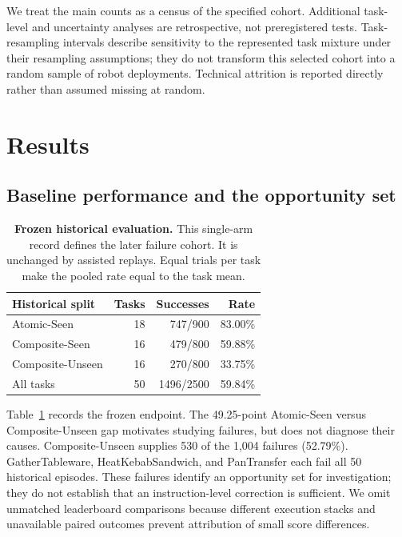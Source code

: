 \documentclass[10pt,twocolumn,letterpaper]{article}
\begin{document}
We treat the main counts as a census of the specified cohort. Additional task-level and uncertainty analyses are retrospective, not preregistered tests. Task-resampling intervals describe sensitivity to the represented task mixture under their resampling assumptions; they do not transform this selected cohort into a random sample of robot deployments. Technical attrition is reported directly rather than assumed missing at random.

\section{Results}
\label{sec:results}
\subsection{Baseline performance and the opportunity set}
\begin{table}[t]
\centering\small
\begin{tabular}{@{}lrrr@{}}
\toprule
Historical split & Tasks & Successes & Rate\\
\midrule
Atomic-Seen &18&747/900&83.00\%\\
Composite-Seen &16&479/800&59.88\%\\
Composite-Unseen &16&270/800&33.75\%\\
\midrule
All tasks &50&1496/2500&59.84\%\\
\bottomrule
\end{tabular}
\caption{\textbf{Frozen historical evaluation.} This single-arm record defines the later failure cohort. It is unchanged by assisted replays. Equal trials per task make the pooled rate equal to the task mean.}
\label{tab:baseline}
\end{table}
Table~\ref{tab:baseline} records the frozen endpoint. The 49.25-point Atomic-Seen versus Composite-Unseen gap motivates studying failures, but does not diagnose their causes. Composite-Unseen supplies 530 of the 1,004 failures (52.79\%). GatherTableware, HeatKebabSandwich, and PanTransfer each fail all 50 historical episodes. These failures identify an opportunity set for investigation; they do not establish that an instruction-level correction is sufficient. We omit unmatched leaderboard comparisons because different execution stacks and unavailable paired outcomes prevent attribution of small score differences.
\end{document}
